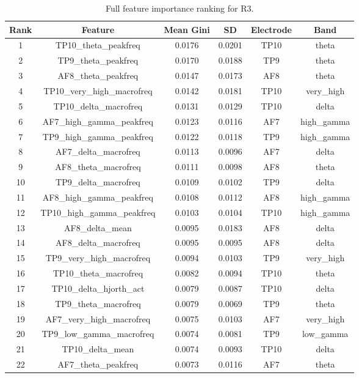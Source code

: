 \begin{table}[hptb]
\small
\centering
\begin{table}
\caption{Full feature importance ranking for R3.}
\label{tab:app_a_r3}
\begin{tabular}{cccccc}
\toprule
Rank & Feature & Mean Gini & SD & Electrode & Band \\
\midrule
1 & TP10_theta_peakfreq & 0.0176 & 0.0201 & TP10 & theta \\
2 & TP9_theta_peakfreq & 0.0170 & 0.0188 & TP9 & theta \\
3 & AF8_theta_peakfreq & 0.0147 & 0.0173 & AF8 & theta \\
4 & TP10_very_high_macrofreq & 0.0142 & 0.0181 & TP10 & very_high \\
5 & TP10_delta_macrofreq & 0.0131 & 0.0129 & TP10 & delta \\
6 & AF7_high_gamma_peakfreq & 0.0123 & 0.0116 & AF7 & high_gamma \\
7 & TP9_high_gamma_peakfreq & 0.0122 & 0.0118 & TP9 & high_gamma \\
8 & AF7_delta_macrofreq & 0.0113 & 0.0096 & AF7 & delta \\
9 & AF8_theta_macrofreq & 0.0111 & 0.0098 & AF8 & theta \\
10 & TP9_delta_macrofreq & 0.0109 & 0.0102 & TP9 & delta \\
11 & AF8_high_gamma_peakfreq & 0.0108 & 0.0112 & AF8 & high_gamma \\
12 & TP10_high_gamma_peakfreq & 0.0103 & 0.0104 & TP10 & high_gamma \\
13 & AF8_delta_mean & 0.0095 & 0.0183 & AF8 & delta \\
14 & AF8_delta_macrofreq & 0.0095 & 0.0095 & AF8 & delta \\
15 & TP9_very_high_macrofreq & 0.0094 & 0.0103 & TP9 & very_high \\
16 & TP10_theta_macrofreq & 0.0082 & 0.0094 & TP10 & theta \\
17 & TP10_delta_hjorth_act & 0.0079 & 0.0087 & TP10 & delta \\
18 & TP9_theta_macrofreq & 0.0079 & 0.0069 & TP9 & theta \\
19 & AF7_very_high_macrofreq & 0.0075 & 0.0103 & AF7 & very_high \\
20 & TP9_low_gamma_macrofreq & 0.0074 & 0.0081 & TP9 & low_gamma \\
21 & TP10_delta_mean & 0.0074 & 0.0093 & TP10 & delta \\
22 & AF7_theta_peakfreq & 0.0073 & 0.0116 & AF7 & theta \\

\end{tabular}
\end{table}
\end{table}
